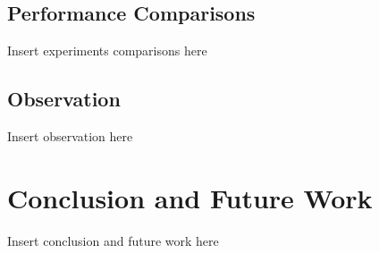 \documentclass[conference]{IEEEtran}
\begin{document}

\subsection{Performance Comparisons}

Insert experiments comparisons here


\subsection{Observation}

Insert observation here



\section{Conclusion and Future Work}

Insert conclusion and future work here

\end{document}
